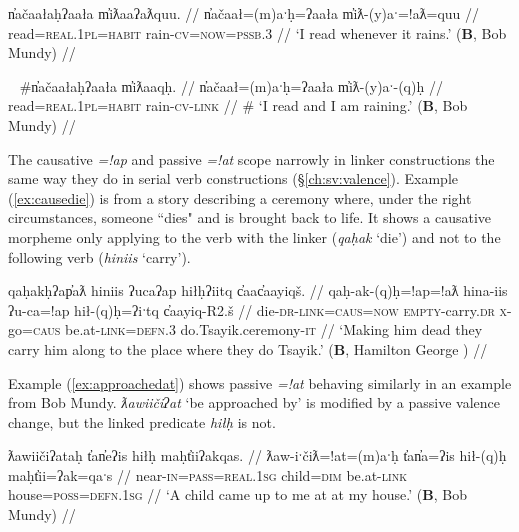 \ex \label{ex:readrain}
\begingl
\glpreamble n̓ačaałaḥʔaała m̓iƛaaʔaƛquu. //
\gla n̓ačaał=(m)aˑḥ=ʔaała m̓iƛ-(y)aˑ=!aƛ=quu //
\glb read=\textsc{real.1pl}=\textsc{habit} rain-\textsc{cv}=\textsc{now}=\textsc{pssb.3} //
\glft `I read whenever it rains.' (\textbf{B}, Bob Mundy) //
\endgl
\xe

\ex~ \label{ex:readrain2}
\begingl
\glpreamble \#n̓ačaałaḥʔaała m̓iƛaaqḥ. //
\gla n̓ačaał=(m)aˑḥ=ʔaała m̓iƛ-(y)aˑ-(q)ḥ //
\glb read=\textsc{real.1pl}=\textsc{habit} rain-\textsc{cv}-\textsc{link} //
\glft \# `I read and I am raining.' (\textbf{B}, Bob Mundy) //
\endgl
\xe

The causative \textit{=!ap} and passive \textit{=!at} scope narrowly in linker constructions the same way they do in serial verb constructions (\S\ref{ch:sv:valence}). Example (\ref{ex:causedie}) is from a story describing a ceremony where, under the right circumstances, someone ``dies" and is brought back to life. It shows a causative morpheme only applying to the verb with the linker (\textit{qaḥak} `die') and not to the following verb (\textit{hiniis} `carry').

\ex \label{ex:causedie}
\begingl
\glpreamble qaḥakḥʔap̓aƛ hiniis ʔucaʔap hiłḥʔiitq c̓aac̓aayiqš. //
\gla qaḥ-ak-(q)ḥ=!ap=!aƛ hina-iis ʔu-ca=!ap hił-(q)ḥ=ʔiˑtq c̓aayiq-R2.š //
\glb die-\textsc{dr}-\textsc{link}=\textsc{caus}=\textsc{now} \textsc{empty}-carry.\textsc{dr} \textsc{x}-go=\textsc{caus} be.at-\textsc{link}=\textsc{defn.3} do.Tsayik.ceremony-\textsc{it} //
\glft `Making him dead they carry him along to the place where they do Tsayik.' (\textbf{B}, Hamilton George \citet[p.~106]{sapir1939}) //
\endgl
\xe

Example (\ref{ex:approachedat}) shows passive \textit{=!at} behaving similarly in an example from Bob Mundy. \textit{ƛawiičiʔat} `be approached by' is modified by a passive valence change, but the linked predicate \textit{hiłḥ} is not.

\ex \label{ex:approachedat}
\begingl
\glpreamble ƛawiičiʔataḥ t̓an̓eʔis hiłḥ maḥt̓iiʔakqas. //
\gla ƛaw-iˑčiƛ=!at=(m)aˑḥ t̓an̓a=ʔis hił-(q)ḥ maḥt̓ii=ʔak=qaˑs //
\glb near-\textsc{in}=\textsc{pass}=\textsc{real.1sg} child=\textsc{dim} be.at-\textsc{link} house=\textsc{poss}=\textsc{defn.1sg} //
\glft `A child came up to me at at my house.' (\textbf{B}, Bob Mundy) //
\endgl
\xe

